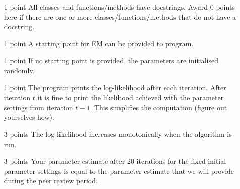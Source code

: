 \documentclass[11pt, leqno, a4paper]{article}
\begin{document}
\begin{itemize}
\item[1 point] All classes and functions/methods have docstrings. Award 0 points here if there are one or more classes/functions/methods that do not have a 
docstring.
\item[1 point] A starting point for EM can be provided to program.
\item[1 point] If no starting point is provided, the parameters are initialised randomly.
\item[1 point] The program prints the log-likelihood after each iteration. After iteration $ t $ it is fine to print the likelihood achieved with the parameter
settings from  iteration $ t-1 $. This simplifies the computation (figure out yourselves how).
\item[3 points] The log-likelihood increases monotonically when the algorithm is run.
\item[3 points] Your parameter estimate after 20 iterations for the fixed initial parameter settings is equal to the parameter estimate that we will provide during the 
peer review period.
\end{itemize}
\end{document}
